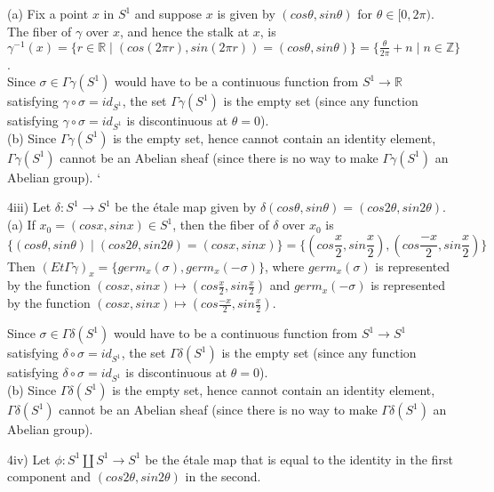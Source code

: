 (a) Fix a point $x$ in $S^1$ and suppose $x$ is given by $(cos\theta, sin\theta)$ for $\theta \in [0,2\pi)$. The fiber of $\gamma$ over $x$, and hence the stalk at $x$, is $\gamma^{-1}(x)=\{r \in \mathbb{R} \mid (cos(2\pi r), sin(2\pi r)) = (cos\theta, sin\theta)\} = \{\frac{\theta}{2\pi} + n \mid n \in \mathbb{Z}\}$. \\

Since $\sigma \in \Gamma \gamma(S^1)$ would have to be a continuous function from $S^1 \rightarrow \mathbb{R}$ satisfying $\gamma \circ \sigma = id_{S^1}$, the set $\Gamma \gamma (S^1)$ is the empty set (since any function satisfying $\gamma \circ \sigma = id_{S^1}$ is discontinuous at $\theta = 0$).\\

(b) Since $\Gamma \gamma (S^1)$ is the empty set, hence cannot contain an identity element, $\Gamma \gamma (S^1)$ cannot be an Abelian sheaf (since there is no way to make $\Gamma \gamma (S^1)$ an Abelian group).
\newpage`

4iii) Let $\delta:S^1 \rightarrow S^1$ be the \'etale map given by $\delta(cos\theta, sin\theta)=(cos2\theta, sin2\theta)$.\\

(a) If $x_0 = (cosx,sinx) \in S^1$, then the fiber of $\delta$ over $x_0$ is \[\{(cos\theta, sin\theta) \mid (cos2\theta, sin2\theta)=(cosx, sinx)\} = \{(cos\frac{x}{2}, sin\frac{x}{2}), (cos\frac{-x}{2}, sin\frac{x}{2})\}\]
Then $(Et \Gamma \gamma)_x = \{germ_x(\sigma), germ_x(-\sigma)\}$, where $germ_x(\sigma)$ is represented by the function $(cosx, sinx) \mapsto (cos\frac{x}{2}, sin\frac{x}{2})$ and $germ_x(-\sigma)$ is represented by the function $(cosx, sinx) \mapsto  (cos\frac{-x}{2}, sin\frac{x}{2})$.

Since $\sigma \in \Gamma \delta(S^1)$ would have to be a continuous function from $S^1 \rightarrow S^1$ satisfying $\delta \circ \sigma = id_{S^1}$, the set $\Gamma \delta (S^1)$ is the empty set (since any function satisfying $\delta \circ \sigma = id_{S^1}$ is discontinuous at $\theta = 0$).\\

(b) Since $\Gamma \delta (S^1)$ is the empty set, hence cannot contain an identity element, $\Gamma \delta (S^1)$ cannot be an Abelian sheaf (since there is no way to make $\Gamma \delta (S^1)$ an Abelian group).

\newpage

4iv) Let $\phi: S^1 \coprod S^1 \rightarrow S^1$ be the \'etale map that is equal to the identity in the first component and $(cos2\theta, sin2\theta)$ in the second. \\

